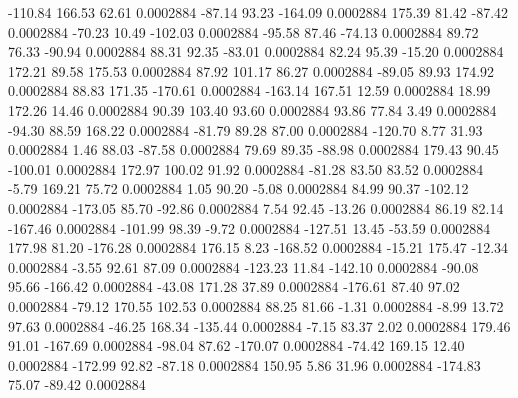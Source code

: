      -110.84      166.53       62.61     0.0002884
      -87.14       93.23     -164.09     0.0002884
      175.39       81.42      -87.42     0.0002884
      -70.23       10.49     -102.03     0.0002884
      -95.58       87.46      -74.13     0.0002884
       89.72       76.33      -90.94     0.0002884
       88.31       92.35      -83.01     0.0002884
       82.24       95.39      -15.20     0.0002884
      172.21       89.58      175.53     0.0002884
       87.92      101.17       86.27     0.0002884
      -89.05       89.93      174.92     0.0002884
       88.83      171.35     -170.61     0.0002884
     -163.14      167.51       12.59     0.0002884
       18.99      172.26       14.46     0.0002884
       90.39      103.40       93.60     0.0002884
       93.86       77.84        3.49     0.0002884
      -94.30       88.59      168.22     0.0002884
      -81.79       89.28       87.00     0.0002884
     -120.70        8.77       31.93     0.0002884
        1.46       88.03      -87.58     0.0002884
       79.69       89.35      -88.98     0.0002884
      179.43       90.45     -100.01     0.0002884
      172.97      100.02       91.92     0.0002884
      -81.28       83.50       83.52     0.0002884
       -5.79      169.21       75.72     0.0002884
        1.05       90.20       -5.08     0.0002884
       84.99       90.37     -102.12     0.0002884
     -173.05       85.70      -92.86     0.0002884
        7.54       92.45      -13.26     0.0002884
       86.19       82.14     -167.46     0.0002884
     -101.99       98.39       -9.72     0.0002884
     -127.51       13.45      -53.59     0.0002884
      177.98       81.20     -176.28     0.0002884
      176.15        8.23     -168.52     0.0002884
      -15.21      175.47      -12.34     0.0002884
       -3.55       92.61       87.09     0.0002884
     -123.23       11.84     -142.10     0.0002884
      -90.08       95.66     -166.42     0.0002884
      -43.08      171.28       37.89     0.0002884
     -176.61       87.40       97.02     0.0002884
      -79.12      170.55      102.53     0.0002884
       88.25       81.66       -1.31     0.0002884
       -8.99       13.72       97.63     0.0002884
      -46.25      168.34     -135.44     0.0002884
       -7.15       83.37        2.02     0.0002884
      179.46       91.01     -167.69     0.0002884
      -98.04       87.62     -170.07     0.0002884
      -74.42      169.15       12.40     0.0002884
     -172.99       92.82      -87.18     0.0002884
      150.95        5.86       31.96     0.0002884
     -174.83       75.07      -89.42     0.0002884

